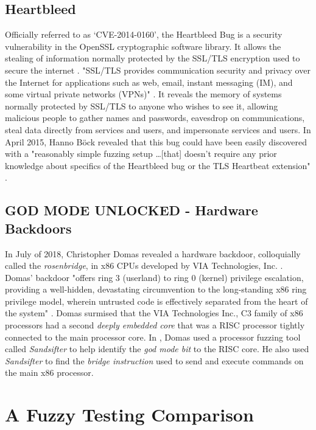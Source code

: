 \documentclass[10pt, final, journal, letterpaper, twoside, twocolumn]{IEEEtran}
\begin{document}
	\subsection{Heartbleed}
	Officially referred to as `CVE-2014-0160', the Heartbleed Bug is a security vulnerability in the OpenSSL cryptographic software library. It allows the stealing of information normally protected by the SSL/TLS encryption used to secure the internet \cite{heartbleed}. "SSL/TLS provides communication security and privacy over the Internet for applications such as web, email, instant messaging (IM), and some virtual private networks (VPNs)" \cite{heartbleed}. It reveals the memory of systems normally protected by SSL/TLS to anyone who wishes to see it, allowing malicious people to gather names and passwords, eavesdrop on communications, steal data directly from services and users, and impersonate services and users. In April 2015, Hanno B\"{o}ck revealed that this bug could have been easily discovered with a "reasonably simple fuzzing setup \dots [that] doesn't require any prior knowledge about specifics of the Heartbleed bug or the TLS Heartbeat extension" \cite{hanno}.
	
	\subsection{GOD MODE UNLOCKED - Hardware Backdoors}
		In July of 2018, Christopher Domas revealed a hardware backdoor, colloquially called the \textit{rosenbridge}, in x86 CPUs developed by VIA Technologies, Inc. \cite{GOD}. Domas' backdoor "offers ring 3 (userland) to ring 0 (kernel) privilege escalation, providing a well-hidden, devastating circumvention to the long-standing x86 ring privilege model, wherein untrusted code is effectively separated from the heart of the system" \cite{GOD}. Domas surmised that the VIA Technologies Inc., C3 family of x86 processors had a second \textit{deeply embedded core} that was a RISC processor tightly connected to the main processor core. In \cite{GOD}, Domas used a processor fuzzing tool called \textit{Sandsifter} to help identify the \textit{god mode bit} to the RISC core. He also used \textit{Sandsifter} to find the \textit{bridge instruction} used to send and execute commands on the main x86 processor.
	

\section{\label{sec:compare}A Fuzzy Testing Comparison}
\end{document}
